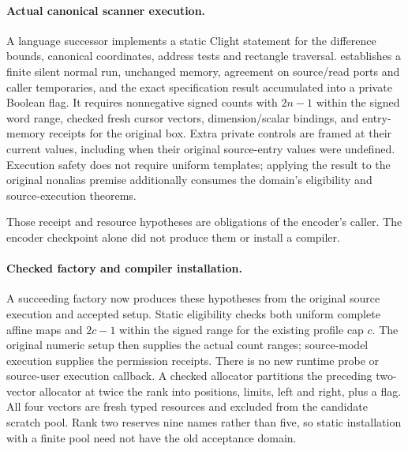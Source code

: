 \paragraph{Actual canonical scanner execution.}
A language successor implements a static Clight statement for the difference
bounds, canonical coordinates, address tests and rectangle traversal.
 establishes a finite silent normal run,
unchanged memory, agreement on source/read ports and caller temporaries, and
the exact specification result accumulated into a private Boolean flag.
It requires nonnegative signed counts with $2n-1$ within the signed word range,
checked fresh cursor vectors, dimension/scalar bindings, and entry-memory
receipts for the original box. Extra private controls are framed at their
current values, including when their original source-entry values were
undefined. Execution safety does not require uniform templates; applying the
result to the original nonalias premise additionally consumes the domain's
eligibility and source-execution theorems.

Those receipt and resource hypotheses are obligations of the encoder's caller.
The encoder checkpoint alone did not produce them or install a compiler.

\paragraph{Checked factory and compiler installation.}
A succeeding factory now produces these hypotheses from the original source
execution and accepted setup. Static eligibility checks both uniform complete
affine maps and $2c-1$ within the signed range for the existing profile cap $c$.
The original numeric setup then supplies the actual count ranges; source-model
execution supplies the permission receipts. There is no new runtime probe or
source-user execution callback. A checked allocator partitions the preceding
two-vector allocator at twice the rank into positions, limits, left and right,
plus a flag. All four vectors are fresh typed resources and excluded from the
candidate scratch pool. Rank two reserves nine names rather than five, so
static installation with a finite pool need not have the old acceptance domain.

